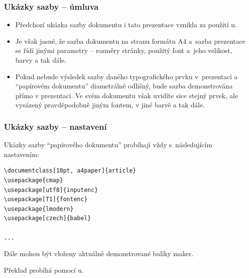 \begin{frame}
	\frametitle{Ukázky sazby -- úmluva}
	\begin{itemize}
		\item Předchozí ukázka sazby dokumentu i tato prezentace vznikla za použití u.
		\item Je však jasné, že sazba dokumentu na stranu formátu A4 a~sazba prezentace se řídí jinými parametry -- rozměry stránky, použitý font a~jeho velikost, barvy a tak dále.
		\item Pokud nebude výsledek sazby daného typografického prvku v~prezentaci a \enquote{papírovém dokumentu} diametrálně odlišný, bude sazba demonstrována přímo v prezentaci. Ve svém dokumentu však uvidíte sice stejný prvek, ale vysázený pravděpodobně jiným fontem, v jiné barvě a tak dále.
	\end{itemize}
\end{frame}


\begin{frame}
	\frametitle{Ukázky sazby -- nastavení}
	Ukázky sazby \enquote{papírového dokumentu} probíhají vždy s~následujícím nastavením:\par
	\begin{BVerbatim}
\documentclass[10pt, a4paper]{article}
\usepackage{cmap}
\usepackage[utf8]{inputenc}
\usepackage[T1]{fontenc}
\usepackage{lmodern}
\usepackage[czech]{babel}

...

	\end{BVerbatim}
	\par
	 Dále mohou být vloženy aktuálně demonstrované balíky maker.\par
	 Překlad probíhá pomocí u.
\end{frame}

\endinput
